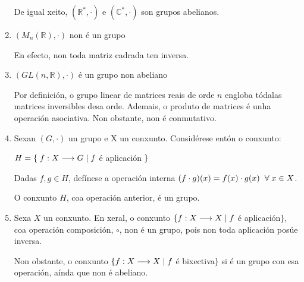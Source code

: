 \documentclass[twoside]{report}
\theoremstyle{mystyle}
\begin{document}
\begin{enumerate}
    De igual xeito, $(\mathbb{R}^{*}, \cdot)$ e $(\mathbb{C}^{*}, \cdot)$ son grupos abelianos.
    
    \item $(M_{n}(\mathbb{R}), \cdot)$ non é un grupo
    
    \vspace{1mm}
    
    En efecto, non toda matriz cadrada ten inversa.
    
    \item $(GL(n, \mathbb{R}), \cdot)$ é un grupo non abeliano
    
    \vspace{1mm}
    
    Por definición, o grupo linear de matrices reais de orde $n$ engloba tódalas matrices inversibles desa orde. Ademais, o produto de matrices é unha operación asociativa. Non obstante, non é conmutativo.
    
    \item Sexan $(G, \cdot)$ un grupo e X un conxunto. Considérese entón o conxunto:
    
    \begin{center}
        $H = \{ \hspace{1mm} f: X \longrightarrow G \hspace{1mm} | \hspace{1mm} f$ é aplicación$ \hspace{1mm}\}$
    \end{center}
    
    Dadas $f,g \in H$, defínese a operación interna $(f \cdot g)(x) = f(x) \cdot g(x) \hspace{2mm} \forall \hspace{1mm} x \in X$.
    
    O conxunto $H$, coa operación anterior, é un grupo.
    
    \vspace{1mm}
    
    \item Sexa $X$ un conxunto. En xeral, o conxunto $\{ f: X \longrightarrow X \hspace{1MM} | \hspace{1MM} f$ é aplicación$\}$, coa operación composición, $\circ$, non é un grupo, pois non toda aplicación posúe inversa. 
    
    Non obstante, o conxunto $\{ f: X \longrightarrow X \hspace{1mm} | \hspace{1mm} f$ é bixectiva$\}$ si é un grupo con esa operación, aínda que non é abeliano.
    
\end{enumerate}
\end{document}
